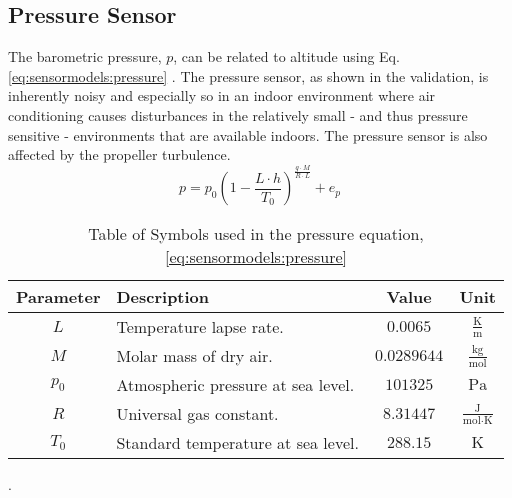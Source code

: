     \subsection{Pressure Sensor}
        The barometric pressure, $p$, can be related to altitude using Eq. \eqref{eq:sensormodels:pressure} \cite{physicshandbook}.
        The pressure sensor, as shown in the validation, is inherently
        noisy and especially so in an indoor environment where air conditioning
        causes disturbances in the relatively small - and thus pressure sensitive -
        environments that are available indoors.
        The pressure sensor is also affected by the propeller turbulence.
        \begin{equation}
            \label{eq:sensormodels:pressure}
            p = p_{0} \left( 1 - \frac{L \cdot h}{T_{0}} \right)^{\frac{g \cdot M}{R\cdot L}} + e_{p}
        \end{equation}
        \begin{table}
            \begin{tabularx}{\tablewidth}{|c|X|c|c|}\hline
                \textbf{Parameter} & \textbf{Description} & \textbf{Value} & \textbf{Unit} \\\hline
                $L$       & Temperature lapse rate.            & $0.0065$ & $\frac{\text{K}}{\text{m}}$ \\\hline
                $M$       & Molar mass of dry air.             & $0.0289644$ & $\frac{\text{kg}}{\text{mol}}$ \\\hline
                $p_{0}$   & Atmospheric pressure at sea level. & $101325$ & $\text{Pa}$ \\\hline
                $R$       & Universal gas constant.            & $8.31447$ & $\frac{\text{J}}{\text{mol} \cdot \text{K}}$ \\\hline
                $T_{0}$   & Standard temperature at sea level. & $288.15$ & $\text{K}$ \\\hline
            \end{tabularx}
            \label{tos:pressuresensor}
            \caption{Table of Symbols used in the pressure equation, \eqref{eq:sensormodels:pressure}}.
        \end{table}

    

